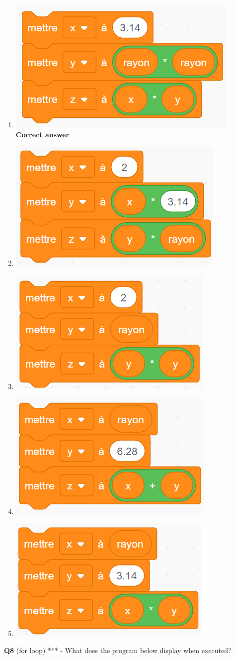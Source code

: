 \documentclass[14pt]{extarticle}
\begin{document}
\begin{enumerate}[label=\alph*)]
    \item \includegraphics[width=0.4\linewidth]{images/pretest/_Q7_A.png} \textbf{Correct answer}
    \item \includegraphics[width=0.4\linewidth]{images/pretest/_Q7_B.png}
    \item \includegraphics[width=0.4\linewidth]{images/pretest/_Q7_C.png}
    \item \includegraphics[width=0.4\linewidth]{images/pretest/_Q7_D.png}
    \item \includegraphics[width=0.4\linewidth]{images/pretest/_Q7_E.png}
\end{enumerate}
\newpage
\textbf{Q8}
(for loop) *** - What does the program below display when executed?
\end{document}
